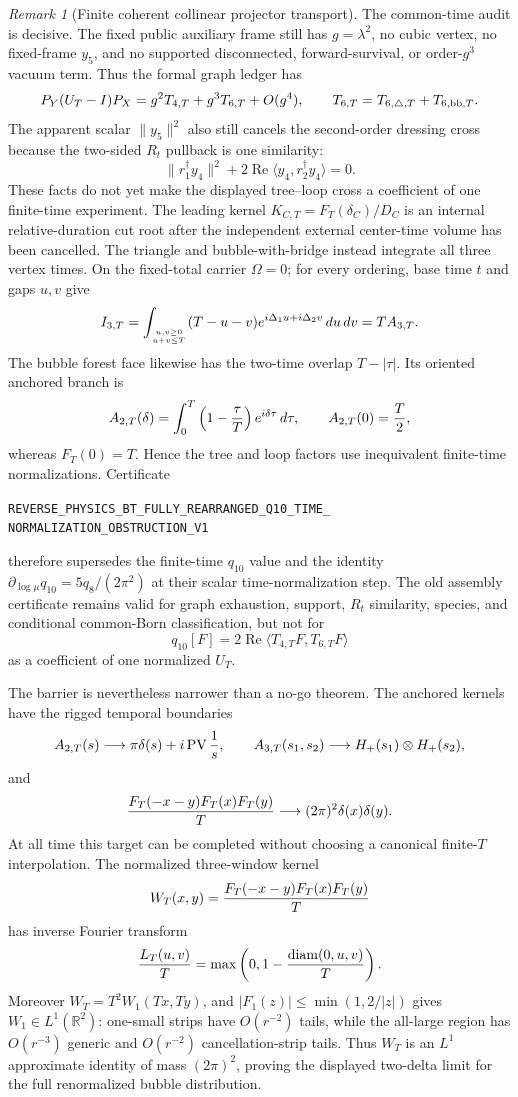 \documentclass[11pt]{article}
\theoremstyle{definition}
\theoremstyle{remark}
\newtheorem{remark}[theorem]{Remark}
\begin{document}
\begin{remark}[Finite coherent collinear projector transport]
The common-time audit is decisive.  The fixed public auxiliary frame still
has \(g=\lambda^2\), no cubic vertex, no fixed-frame \(y_5\), and no supported
disconnected, forward-survival, or order-\(g^3\) vacuum term.  Thus the formal
graph ledger has
\[
 P_Y(U_T-I)P_X=g^2T_{4,T}+g^3T_{6,T}+O(g^4),
 \qquad
 T_{6,T}=T_{6,\triangle,T}+T_{6,{\rm bb},T}.
\]
The apparent scalar \(\lVert y_5\rVert^2\) also still cancels the
second-order dressing cross because the two-sided \(R_t\) pullback is one
similarity:
\[
 \lVert r_1^\dagger y_4\rVert^2
 +2\operatorname{Re}\langle y_4,r_2^\dagger y_4\rangle=0.
\]
These facts do not yet make the displayed tree--loop cross a coefficient of
one finite-time experiment.  The leading kernel
\(K_{C,T}=F_T(\delta_C)/D_C\) is an internal relative-duration cut root after
the independent external center-time volume has been cancelled.  The
triangle and bubble-with-bridge instead integrate all three vertex times.
On the fixed-total carrier \(\Omega=0\); for every ordering, base time \(t\)
and gaps \(u,v\) give
\[
 I_{3,T}=\int_{u,v\ge0\atop u+v\le T}
 (T-u-v)e^{i\Delta_1u+i\Delta_2v}\,du\,dv
 =T A_{3,T}.
\]
The bubble forest face likewise has the two-time overlap \(T-|\tau|\).  Its
oriented anchored branch is
\[
 A_{2,T}(\delta)=\int_0^T
 \left(1-{\tau\over T}\right)e^{i\delta\tau}\,d\tau,
 \qquad A_{2,T}(0)={T\over2},
\]
whereas \(F_T(0)=T\).  Hence the tree and loop factors use inequivalent
finite-time normalizations.  Certificate
\par\noindent
\texttt{REVERSE\_PHYSICS\_BT\_FULLY\_REARRANGED\_Q10\_TIME\_}
\allowbreak\texttt{NORMALIZATION\_OBSTRUCTION\_V1}
\par\noindent
therefore supersedes the finite-time \(q_{10}\) value and the identity
\(\partial_{\log\mu}q_{10}=5q_8/(2\pi^2)\) at their scalar time-normalization
step.  The old assembly certificate remains valid for graph exhaustion,
support, \(R_t\) similarity, species, and conditional common-Born
classification, but not for
\[
 q_{10}[F]=2\operatorname{Re}
 \langle T_{4,T}F,T_{6,T}F\rangle
\]
as a coefficient of one normalized \(U_T\).

The barrier is nevertheless narrower than a no-go theorem.  The anchored
kernels have the rigged temporal boundaries
\[
 A_{2,T}(s)\longrightarrow
 \pi\delta(s)+i\operatorname{PV}{1\over s},
 \qquad
 A_{3,T}(s_1,s_2)\longrightarrow H_+(s_1)\otimes H_+(s_2),
\]
and
\[
 {F_T(-x-y)F_T(x)F_T(y)\over T}
 \longrightarrow(2\pi)^2\delta(x)\delta(y).
\]
At all time this target can be completed without choosing a canonical
finite-\(T\) interpolation.  The normalized three-window kernel
\[
 W_T(x,y)={F_T(-x-y)F_T(x)F_T(y)\over T}
\]
has inverse Fourier transform
\[
 {L_T(u,v)\over T}
 =\max\left(0,1-{\operatorname{diam}(0,u,v)\over T}\right).
\]
Moreover \(W_T=T^2W_1(Tx,Ty)\), and
\(\lvert F_1(z)\rvert\leq\min(1,2/\lvert z\rvert)\) gives
\(W_1\in L^1(\mathbb R^2)\): one-small strips have \(O(r^{-2})\) tails,
while the all-large region has \(O(r^{-3})\) generic and \(O(r^{-2})\)
cancellation-strip tails.  Thus \(W_T\) is an \(L^1\) approximate identity
of mass \((2\pi)^2\), proving the displayed two-delta limit for the full
renormalized bubble distribution.


\end{remark}
\end{document}
